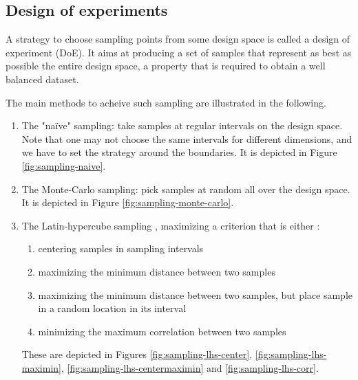 \subsection{Design of experiments}

A strategy to choose sampling points from some design space is called a design of experiment (DoE). It aims at producing a set of samples that represent as best as possible the entire design space, a property that is required to obtain a well balanced dataset. 

The main methods to acheive such sampling are \cite{doe} illustrated in the following.
\begin{enumerate}
    \item The "naïve" sampling: take samples at regular intervals on the design space. Note that one may not choose the same intervals for different dimensions, and we have to set the strategy around the boundaries. It is depicted in Figure \ref{fig:sampling-naive}.
    \item The Monte-Carlo sampling: pick samples at random all over the design space. It is depicted in Figure \ref{fig:sampling-monte-carlo}.
    \item The Latin-hypercube sampling \cite{wiki-lhs}, maximizing a criterion that is either \cite{pydoe-docs}:
    \begin{enumerate}
        \item centering samples in sampling intervals
        \item maximizing the minimum distance between two samples
        \item maximizing the minimum distance between two samples, but place sample in a random location in its interval
        \item minimizing the maximum correlation between two samples
    \end{enumerate}
    These are depicted in Figures \ref{fig:sampling-lhs-center}, \ref{fig:sampling-lhs-maximin}, \ref{fig:sampling-lhs-centermaximin} and \ref{fig:sampling-lhs-corr}.
\end{enumerate}

